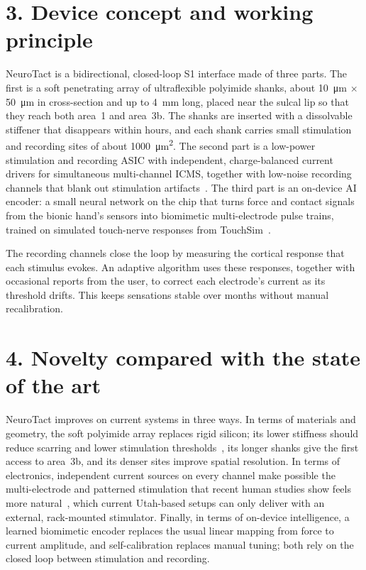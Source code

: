 \documentclass[11pt]{article}
\begin{document}
\section*{3. Device concept and working principle}
NeuroTact is a bidirectional, closed-loop S1 interface made of three parts. The first is a soft penetrating array of ultraflexible polyimide shanks, about \SI{10}{\micro m} $\times$ \SI{50}{\micro m} in cross-section and up to \SI{4}{mm} long, placed near the sulcal lip so that they reach both area~1 and area~3b. The shanks are inserted with a dissolvable stiffener that disappears within hours, and each shank carries small stimulation and recording sites of about \SI{1000}{\micro m^2}. The second part is a low-power stimulation and recording ASIC with independent, charge-balanced current drivers for simultaneous multi-channel ICMS, together with low-noise recording channels that blank out stimulation artifacts~\cite{zhou2019}. The third part is an on-device AI encoder: a small neural network on the chip that turns force and contact signals from the bionic hand's sensors into biomimetic multi-electrode pulse trains, trained on simulated touch-nerve responses from TouchSim~\cite{saal2017}.
 
The recording channels close the loop by measuring the cortical response that each stimulus evokes. An adaptive algorithm uses these responses, together with occasional reports from the user, to correct each electrode's current as its threshold drifts. This keeps sensations stable over months without manual recalibration.
 
\section*{4. Novelty compared with the state of the art}
NeuroTact improves on current systems in three ways. In terms of materials and geometry, the soft polyimide array replaces rigid silicon; its lower stiffness should reduce scarring and lower stimulation thresholds~\cite{lycke2023}, its longer shanks give the first access to area~3b, and its denser sites improve spatial resolution. In terms of electronics, independent current sources on every channel make possible the multi-electrode and patterned stimulation that recent human studies show feels more natural~\cite{greenspon2025,valle2025}, which current Utah-based setups can only deliver with an external, rack-mounted stimulator. Finally, in terms of on-device intelligence, a learned biomimetic encoder replaces the usual linear mapping from force to current amplitude, and self-calibration replaces manual tuning; both rely on the closed loop between stimulation and recording.
 
\end{document}
